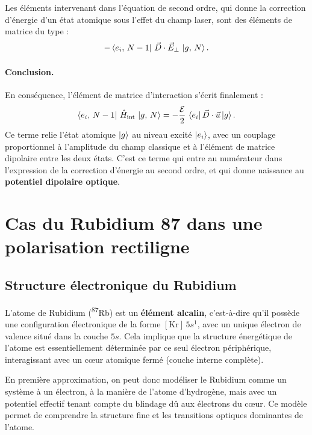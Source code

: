 Les éléments intervenant dans l’équation de second ordre, qui donne la correction d’énergie d’un état atomique sous l’effet du champ laser, sont des éléments de matrice du type :
\[
-\bra{e_i,\,N-1}\,\vec{D} \cdot \vec{E}_\perp\,\ket{g,\,N}.
\]

\paragraph{Conclusion.} En conséquence, l’élément de matrice d’interaction s’écrit finalement :
\[
\bra{e_i,\,N-1} \, \hat H_{\text{int}} \, \ket{g,\,N}
= - \frac{\mathcal{E}}{2} \, \bra{e_i} \vec{D}\cdot \vec{u} \ket{g}.
\]
Ce terme relie l’état atomique \( \ket{g} \) au niveau excité \( \ket{e_i} \), avec un couplage proportionnel à l’amplitude du champ classique et à l’élément de matrice dipolaire entre les deux états. C’est ce terme qui entre au numérateur dans l’expression de la correction d’énergie au second ordre, et qui donne naissance au \textbf{potentiel dipolaire optique}.


\section{Cas du Rubidium 87 dans une polarisation rectiligne}

\subsection{Structure électronique du Rubidium}

L’atome de Rubidium (\textsuperscript{87}Rb) est un \textbf{élément alcalin}, c’est-à-dire qu’il possède une configuration électronique de la forme $[ \mathrm{Kr} ]\,5s^1$, avec un unique électron de valence situé dans la couche $5s$. Cela implique que la structure énergétique de l’atome est essentiellement déterminée par ce seul électron périphérique, interagissant avec un cœur atomique fermé (couche interne complète).

En première approximation, on peut donc modéliser le Rubidium comme un système à un électron, à la manière de l’atome d’hydrogène, mais avec un potentiel effectif tenant compte du blindage dû aux électrons du cœur. Ce modèle permet de comprendre la structure fine et les transitions optiques dominantes de l’atome.

